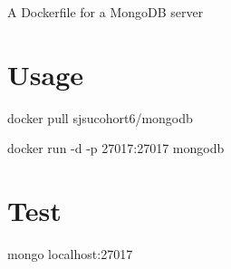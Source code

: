 A Dockerfile for a Mongo\+DB server

\section*{Usage}

docker pull sjsucohort6/mongodb

docker run -\/d -\/p 27017\+:27017 mongodb

\section*{Test}

mongo localhost\+:27017 